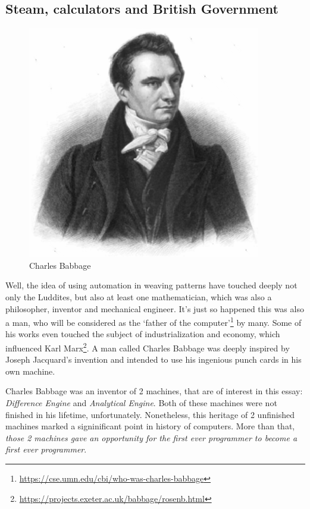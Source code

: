 \documentclass[../../what-is-computer]{subfiles}
\begin{document}
    \subsection{Steam, calculators and British Government}\label{subsection:steam-calculators-and-british-government}
    \begin{figure}
        \centering
        \includegraphics[scale=0.2]{images/persons/person_charles_babbage.png}
        \caption{Charles Babbage}
    \end{figure}

    Well, the idea of using automation in weaving patterns have touched deeply not only the Luddites, but also at least one mathematician, which was also a philosopher,
    inventor and mechanical engineer. It's just so happened this was also a man, who will be considered as the `father of the computer'\footnote{\href{https://cse.umn.edu/cbi/who-was-charles-babbage}
    {https://cse.umn.edu/cbi/who-was-charles-babbage}} by many. Some of his works even touched the subject of industrialization and economy, which influenced Karl 
    Marx\footnote{\href{https://projects.exeter.ac.uk/babbage/rosenb.html}{https://projects.exeter.ac.uk/babbage/rosenb.html}}. A man called Charles Babbage was deeply
    inspired by Joseph Jacquard's invention and intended to use his ingenious punch cards in his own machine. \par

    Charles Babbage was an inventor of 2 machines, that are of interest in this essay: \emph{Difference Engine} and \emph{Analytical Engine}. Both of these machines
    were not finished in his lifetime, unfortunately. Nonetheless, this heritage of 2 unfinished machines marked a signinificant point in history of computers. More 
    than that, \emph{those 2 machines gave an opportunity for the first ever programmer to become a first ever programmer}. \par
\end{document}
